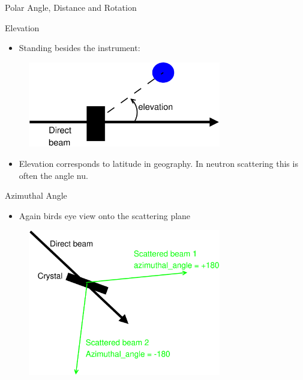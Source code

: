 \documentclass[final,nototal,pdf,mark]{prosper}
\begin{document}
\begin{slide}{Polar Angle, Distance and Rotation }
\end{slide}\begin{slide}{Elevation }
\begin{itemize}\item Standing besides the instrument:
\end{itemize}\begin{center}
\begin{figure}
\includegraphics[width=0.75\textwidth]{elevation.eps}\end{figure}



\end{center}
\begin{itemize}\item Elevation corresponds to latitude in geography. In neutron scattering this is often the angle nu.
\end{itemize}
\end{slide}\begin{slide}{Azimuthal Angle }
\begin{itemize}\item Again birds eye view onto the scattering plane
\end{itemize}\begin{center}
\begin{figure}
\includegraphics[width=0.75\textwidth]{azimuthal.eps}\end{figure}




\end{center}
\end{slide}
\end{document}
